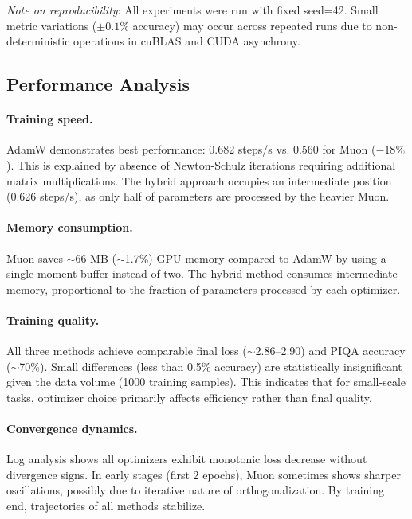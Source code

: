 \documentclass[a4paper,12pt]{article}
\begin{document}
\noindent\textit{Note on reproducibility}: All experiments were run with fixed seed=42. Small metric variations ($\pm 0.1\%$ accuracy) may occur across repeated runs due to non-deterministic operations in cuBLAS and CUDA asynchrony.

\subsection{Performance Analysis}

\paragraph{Training speed.}
AdamW demonstrates best performance: 0.682 steps/s vs. 0.560 for Muon ($-18\%$). This is explained by absence of Newton-Schulz iterations requiring additional matrix multiplications. The hybrid approach occupies an intermediate position (0.626 steps/s), as only half of parameters are processed by the heavier Muon.

\paragraph{Memory consumption.}
Muon saves $\sim$66 MB ($\sim$1.7\%) GPU memory compared to AdamW by using a single moment buffer instead of two. The hybrid method consumes intermediate memory, proportional to the fraction of parameters processed by each optimizer.

\paragraph{Training quality.}
All three methods achieve comparable final loss ($\sim$2.86--2.90) and PIQA accuracy ($\sim$70\%). Small differences (less than 0.5\% accuracy) are statistically insignificant given the data volume (1000 training samples). This indicates that for small-scale tasks, optimizer choice primarily affects efficiency rather than final quality.

\paragraph{Convergence dynamics.}
Log analysis shows all optimizers exhibit monotonic loss decrease without divergence signs. In early stages (first 2 epochs), Muon sometimes shows sharper oscillations, possibly due to iterative nature of orthogonalization. By training end, trajectories of all methods stabilize.
\newpage
\end{document}
